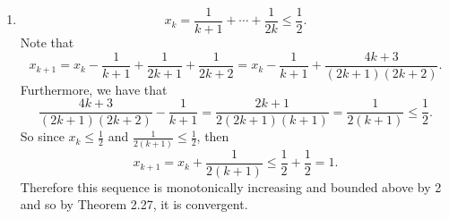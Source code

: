 \documentclass[12pt]{article}
\makeatletter
\theoremstyle{definition}
\theoremstyle{remark}
\renewenvironment{proof}[1][\proofname]{\par
  \pushQED{\qed}%
  \normalfont \topsep6\p@\@plus6\p@\relax
  \list{}{\leftmargin=0mm
          \rightmargin=4mm
          \settowidth{\itemindent}{\itshape#1}%
          \labelwidth=\itemindent
          \parsep=0pt \listparindent=\parindent 
  }
  \item[\hskip\labelsep
        \itshape
    #1\@addpunct{.}]\ignorespaces
}{%
  \popQED\endlist\@endpefalse
}
\let\oldproofname=\proofname
\renewcommand{\proofname}{\bf{\textit{\oldproofname}}}
\makeatother
\begin{document}
\begin{enumerate}[leftmargin=*]
\begin{proof}
                        \begin{equation*}
                            x_k=\frac{1}{k+1}+\cdots +\frac{1}{2k}\leq\frac{1}{2}.
                        \end{equation*}
                    Note that 
                        \begin{equation*}
                            x_{k+1}=x_k-\frac{1}{k+1}+\frac{1}{2k+1}+\frac{1}{2k+2}=x_k-\frac{1}{k+1}+\frac{4k+3}{(2k+1)(2k+2)}.
                        \end{equation*}
                    Furthermore, we have that 
                        \begin{equation*}
                            \frac{4k+3}{(2k+1)(2k+2)}-\frac{1}{k+1}=\frac{2k+1}{2(2k+1)(k+1)}=\frac{1}{2(k+1)}\leq\frac{1}{2}.
                        \end{equation*}
                    So since $x_k\leq \frac{1}{2}$ and $\frac{1}{2(k+1)}\leq\frac{1}{2}$, then 
                        \begin{equation*}
                            x_{k+1}=x_k+\frac{1}{2(k+1)}\leq \frac{1}{2}+\frac{1}{2}=1. 
                        \end{equation*}
                    Therefore this sequence is monotonically increasing and bounded above by 2 and so by Theorem 2.27, it is convergent. 
                \end{proof}
        \end{enumerate}
\end{document}
